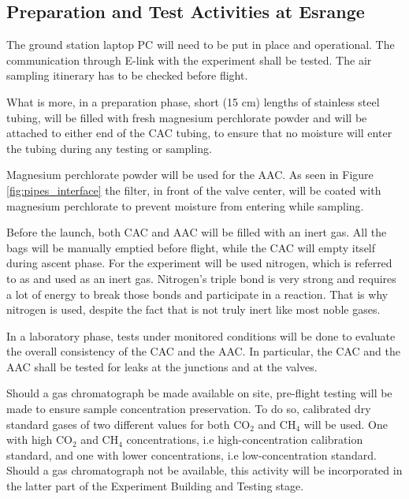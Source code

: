 \subsection{Preparation and Test Activities at Esrange}
The ground station laptop PC will need to be put in place and operational. The communication through E-link with the experiment shall be tested. The air sampling itinerary has to be checked before flight.

What is more, in a preparation phase, short (15 cm) lengths of stainless steel tubing, will be filled with fresh magnesium perchlorate powder \cite{Karion} and will be attached to either end of the CAC tubing, to ensure that no moisture will enter the tubing during any testing or sampling.

Magnesium perchlorate powder will be used for the AAC. As seen in Figure \ref{fig:pipes_interface} the filter, in front of the valve center, will be coated with magnesium perchlorate to prevent moisture from entering while sampling. 

Before the launch, both CAC and AAC will be filled with  an inert gas. All the bags will be manually emptied before flight, while the CAC will empty itself  during ascent phase.  
For the experiment will be used nitrogen, which is referred to as and used as an inert gas. Nitrogen's triple bond is very strong and requires a lot of energy to break those bonds and participate in a reaction. That is why nitrogen is used, despite the fact that is not truly inert like most noble gases.

In a laboratory phase, tests under monitored conditions will be done to evaluate the overall consistency of the CAC and the AAC. In particular, the CAC and the AAC shall be tested for leaks at the junctions and at the valves. 

Should a gas chromatograph be made available on site, pre-flight testing will be made to ensure sample concentration preservation. To do so, calibrated dry standard gases of two different values for both CO$_2$ and CH$_4$ will be used. One with high CO$_2$ and CH$_4$ concentrations, i.e high-concentration calibration standard, and one with lower concentrations, i.e low-concentration standard. Should a gas chromatograph not be available, this activity will be incorporated in the latter part of the Experiment Building and Testing stage.